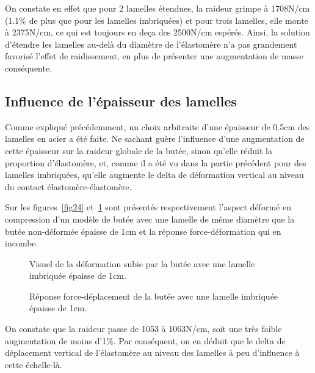 ﻿\documentclass{article}
\begin{document}
On constate en effet que pour 2 lamelles étendues, la raideur grimpe à 1708N/cm (1.1\% de plus que pour les lamelles imbriquées) et pour trois lamelles, elle monte à 2375N/cm, ce qui est toujours en deça des 2500N/cm espérés. Ainsi, la solution d'étendre les lamelles au-delà du diamètre de l'élastomère n'a pas grandement favorisé l'effet de raidissement, en plus de présenter une augmentation de masse conséquente.

\subsection{Influence de l'épaisseur des lamelles}
Comme expliqué précédemment, un choix arbitraite d'une épaisseur de 0.5cm des lamelles en acier a été faite. Ne sachant guère l'influence d'une augmentation de cette épaisseur sur la raideur globale de la butée, sinon qu'elle réduit la proportion d'élastomère, et, comme il a été vu dans la partie précédent pour des lamelles imbriquées, qu'elle augmente le delta de déformation vertical au niveau du contact élastomère-élastomère.

Sur les figures~\ref{fig24} et~\ref{fig25} sont présentés respectivement l'aspect déformé en compression d'un modèle de butée avec une lamelle de même diamètre que la butée non-déformée épaisse de 1cm et la réponse force-déformation qui en incombe.

\begin{figure}[htbp]
	\begin{minipage}[c]{.45\linewidth}
	\begin{center}
	\caption{Visuel de la déformation subie par la butée avec une lamelle imbriquée épaisse de 1cm.}
	\label{fig24}
	\end{center}
	\end{minipage}
	\hfill
	\begin{minipage}[c]{.45\linewidth}
	\begin{center}
	\caption{Réponse force-déplacement de la butée avec une lamelle imbriquée épaisse de 1cm.}
	\label{fig25}
	\end{center}
	\end{minipage}
\end{figure}

On constate que la raideur passe de 1053 à 1063N/cm, soit une très faible augmentation de moins d'1\%. Par conséquent, on en déduit que le delta de déplacement vertical de l'élastomère au niveau des lamelles à peu d'influence à cette échelle-là.
\end{document}
